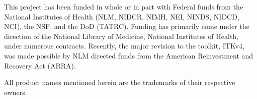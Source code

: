 \begin{minipage}[t][2.5cm][b]{\textwidth}
\begin{center}
This project has been funded in whole or in part with Federal funds from the
National Institutes of Health (NLM, NIDCR, NIMH, NEI, NINDS, NIDCD, NCI), the
NSF, and the DoD (TATRC). Funding has primarily come under the direction of the
National Library of Medicine, National Institutes of Health, under numerous
contracts. Recently, the major revision to the toolkit, ITKv4, was made
possible by NLM directed funds from the American Reinvestment and Recovery Act
(ARRA).
\end{center}
\end{minipage}


\begin{minipage}[t][1.0cm][b]{\textwidth}
\begin{center}
All product names mentioned herein are the trademarks of their respective
owners.
\end{center}
\end{minipage}
